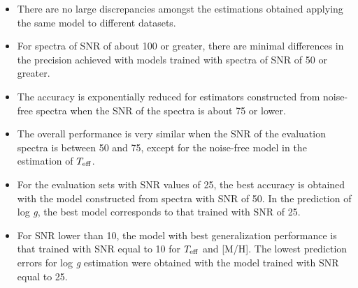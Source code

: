 \documentclass[a4paper,fleqn,usenatbib]{mnras}
\begin{document}
{{{\begin{itemize}
\item There are no large discrepancies amongst the estimations 
	obtained applying the same model to different datasets.
\item For spectra of SNR of about 100 or greater, there are minimal
  differences in the precision achieved with models trained with
  spectra of SNR of 50 or greater.
\item The accuracy is exponentially reduced for estimators
  constructed from noise-free spectra when the SNR of the spectra is
  about 75 or lower.
\item The overall performance is very similar when the SNR of the
  evaluation spectra is between 50 and 75, except for the noise-free
  model in the estimation of $T_{\rm eff}$. 
\item For the evaluation sets with SNR values of 25, the best accuracy
  is obtained with the model constructed from spectra with SNR of 50. 
  In the prediction of log \textit{g}, the best model corresponds to 
  that trained with SNR of 25.
\item For SNR lower than 10, the model with best generalization
  performance is that trained with SNR equal to 10 for $T_{\rm eff}$ 
  and [M/H]. The lowest prediction errors for log \textit{g} estimation 
  were obtained with the model trained with SNR equal to 25.
\end{itemize}

}}}
\end{document}

